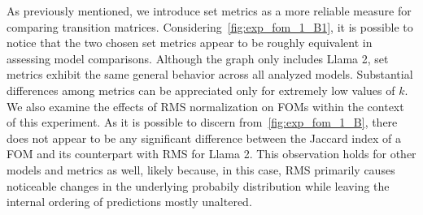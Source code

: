 \begin{table}
    \centering
    \caption[Visualization of the most likely token predicted given common input tokens for various models.]{Visualization of the most likely token predicted by FOM, FOM with RMS and Markov model given common input tokens for Llama 2, Mistral and Phi 3.5.}
    \label{table:exp_fom_predictions}
\end{table}

As previously mentioned, we introduce set metrics as a more reliable measure for comparing transition matrices.
Considering~\cref{fig:exp_fom_1_B1}, it is possible to notice that the two chosen set metrics appear to be roughly equivalent in assessing model comparisons.
Although the graph only includes Llama 2, set metrics exhibit the same general behavior across all analyzed models.
Substantial differences among metrics can be appreciated only for extremely low values of $k$.
We also examine the effects of RMS normalization on FOMs within the context of this experiment.
As it is possible to discern from~\cref{fig:exp_fom_1_B}, there does not appear to be any significant difference between the Jaccard index of a FOM and its counterpart with RMS for Llama 2.
This observation holds for other models and metrics as well, likely because, in this case, RMS primarily causes noticeable changes in the underlying probabily distribution while leaving the internal ordering of predictions mostly unaltered.

